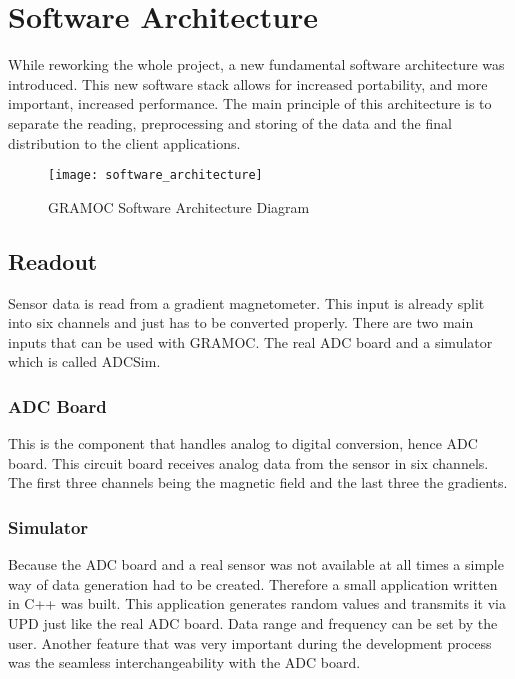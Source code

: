 \chapter{Software Architecture}
\label{ch:Software_Architecture}

While reworking the whole project, a new fundamental software architecture was introduced. This new software stack allows for increased portability, and more important, increased performance. The main principle of this architecture is to separate the reading, preprocessing and storing of the data and the final distribution to the client applications.

\begin{figure}[H]
    \centering
    \texttt{[image: software\_architecture]}
    \caption{GRAMOC Software Architecture Diagram}
    \label{fig:software_architecture}
\end{figure}

\section{Readout}

Sensor data is read from a gradient magnetometer. This input is already split into six channels and just has to be converted properly. There are two main inputs that can be used with GRAMOC. The real ADC board and a simulator which is called ADCSim.

\subsection{ADC Board}

This is the component that handles analog to digital conversion, hence ADC board. This circuit board receives analog data from the sensor in six channels. The first three channels being the magnetic field and the last three the gradients.

\subsection{Simulator}

Because the ADC board and a real sensor was not available at all times a simple way of data generation had to be created. Therefore a small application written in C++ was built. This application generates random values and transmits it via UPD just like the real ADC board. Data range and frequency can be set by the user. Another feature that was very important during the development process was the seamless interchangeability with the ADC board.

